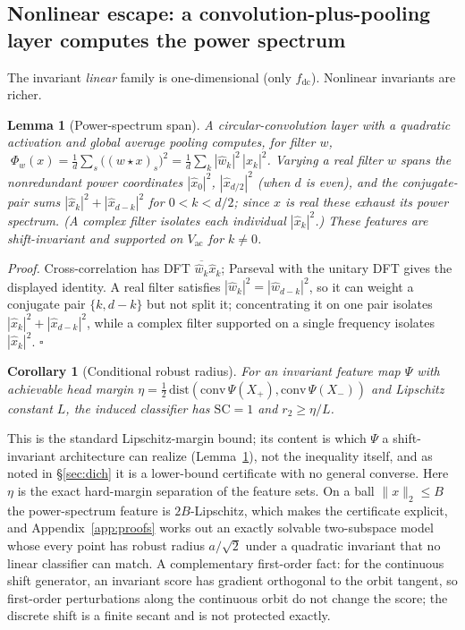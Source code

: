 \documentclass{article}
\newtheorem{lemma}{Lemma}
\newtheorem{corollary}{Corollary}
\theoremstyle{definition}
\newcommand{\fdc}{f_{\mathrm{dc}}}
\newcommand{\Vac}{V_{\mathrm{ac}}}
\newcommand{\dd}{d}
\begin{document}
\subsection{Nonlinear escape: a convolution-plus-pooling layer computes the power spectrum}
The invariant \emph{linear} family is one-dimensional (only $\fdc$). Nonlinear invariants are richer.
\begin{lemma}[Power-spectrum span]\label{lem:ps}
A circular-convolution layer with a quadratic activation and global average pooling computes, for filter $w$, $\;\Phi_{w}(x)=\tfrac1\dd\sum_s\big((w\star x)_s\big)^2=\tfrac1\dd\sum_k |\hat w_k|^2\,|\hat x_k|^2$. Varying a \emph{real} filter $w$ spans the nonredundant power coordinates $|\hat x_0|^2$, $|\hat x_{\dd/2}|^2$ (when $\dd$ is even), and the conjugate-pair sums $|\hat x_k|^2+|\hat x_{\dd-k}|^2$ for $0<k<\dd/2$; since $x$ is real these exhaust its power spectrum. (A complex filter isolates each individual $|\hat x_k|^2$.) These features are shift-invariant and supported on $\Vac$ for $k\neq0$.
\end{lemma}
\emph{Proof.} Cross-correlation has DFT $\overline{\hat w_k}\hat x_k$; Parseval with the unitary DFT gives the displayed identity. A real filter satisfies $|\hat w_k|^2=|\hat w_{\dd-k}|^2$, so it can weight a conjugate pair $\{k,\dd-k\}$ but not split it; concentrating it on one pair isolates $|\hat x_k|^2+|\hat x_{\dd-k}|^2$, while a complex filter supported on a single frequency isolates $|\hat x_k|^2$. \hfill$\square$

\begin{corollary}[Conditional robust radius]\label{cor:C}
For an invariant feature map $\Psi$ with achievable head margin $\eta=\tfrac12\,\mathrm{dist}(\mathrm{conv}\,\Psi(X_+),\mathrm{conv}\,\Psi(X_-))$ and Lipschitz constant $L$, the induced classifier has $\mathrm{SC}=1$ and $r_2\ge \eta/L$.
\end{corollary}
This is the standard Lipschitz-margin bound; its content is which $\Psi$ a shift-invariant architecture can realize (Lemma~\ref{lem:ps}), not the inequality itself, and as noted in \S\ref{sec:dich} it is a lower-bound certificate with no general converse. Here $\eta$ is the exact hard-margin separation of the feature sets. On a ball $\|x\|_2\le B$ the power-spectrum feature is $2B$-Lipschitz, which makes the certificate explicit, and Appendix~\ref{app:proofs} works out an exactly solvable two-subspace model whose every point has robust radius $a/\sqrt2$ under a quadratic invariant that no linear classifier can match. A complementary first-order fact: for the continuous shift generator, an invariant score has gradient orthogonal to the orbit tangent, so first-order perturbations along the continuous orbit do not change the score; the discrete shift is a finite secant and is not protected exactly.
\end{document}
